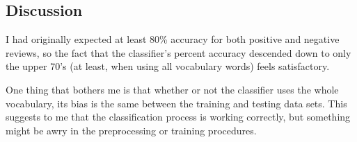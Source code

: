 \documentclass[12pt,letterpaper]{article}
\begin{document}
\subsection*{Discussion}

I had originally expected at least 80\% accuracy for both positive and negative
reviews, so the fact that the classifier's percent accuracy descended down to
only the upper 70's (at least, when using all vocabulary words) feels
satisfactory.

One thing that bothers me is that whether or not the classifier uses the whole
vocabulary, its bias is the same between the training and testing data sets.
This suggests to me that the classification process is working correctly, but
something might be awry in the preprocessing or training procedures.
\end{document}
